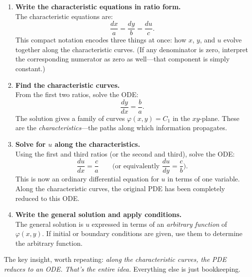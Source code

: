 \begin{enumerate}
    \item \textbf{Write the characteristic equations in ratio form.} \\
    The characteristic equations are:
    \[
    \frac{dx}{a} = \frac{dy}{b} = \frac{du}{c}.
    \]
    This compact notation encodes three things at once: how \( x \), \( y \), and \( u \) evolve together along the characteristic curves. (If any denominator is zero, interpret the corresponding numerator as zero as well---that component is simply constant.)

    \item \textbf{Find the characteristic curves.} \\
    From the first two ratios, solve the ODE:
    \[
    \frac{dy}{dx} = \frac{b}{a}.
    \]
    The solution gives a family of curves \( \varphi(x,y) = C_1 \) in the \(xy\)-plane. These are the \textit{characteristics}---the paths along which information propagates.

    \item \textbf{Solve for \( u \) along the characteristics.} \\
    Using the first and third ratios (or the second and third), solve the ODE:
    \[
    \frac{du}{dx} = \frac{c}{a} \qquad \text{(or equivalently } \frac{du}{dy} = \frac{c}{b}\text{)}.
    \]
    This is now an ordinary differential equation for \( u \) in terms of one variable. Along the characteristic curves, the original PDE has been completely reduced to this ODE.

    \item \textbf{Write the general solution and apply conditions.} \\
    The general solution is \( u \) expressed in terms of an \textit{arbitrary function} of \( \varphi(x,y) \). If initial or boundary conditions are given, use them to determine the arbitrary function.
\end{enumerate}

\noindent The key insight, worth repeating: \textit{along the characteristic curves, the PDE reduces to an ODE. That's the entire idea.} Everything else is just bookkeeping.

